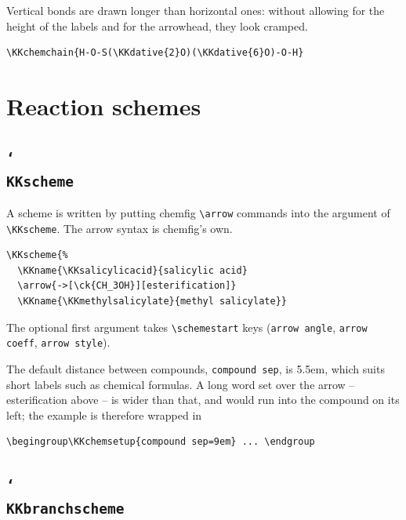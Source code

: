 \documentclass[paper=a4paper,fontsize=10pt]{jlreq}
\begin{document}
Vertical bonds are drawn longer than horizontal ones: without allowing for the
height of the labels and for the arrowhead, they look cramped.

\begin{verbatim}
\KKchemchain{H-O-S(\KKdative{2}O)(\KKdative{6}O)-O-H}
\end{verbatim}

\begin{center}
\KKsulfuricacid\qquad\KKnitricacid\qquad\KKphosphoricacid
\end{center}

\section{Reaction schemes}

\subsection{\texttt{\char`\\KKscheme}}

A scheme is written by putting \textsf{chemfig} \verb|\arrow| commands into the
argument of \verb|\KKscheme|. The arrow syntax is \textsf{chemfig}'s own.

\begin{verbatim}
\KKscheme{%
  \KKname{\KKsalicylicacid}{salicylic acid}
  \arrow{->[\ck{CH_3OH}][esterification]}
  \KKname{\KKmethylsalicylate}{methyl salicylate}}
\end{verbatim}

\begingroup
{}
\endgroup

The optional first argument takes \verb|\schemestart| keys
(\verb|arrow angle|, \verb|arrow coeff|, \verb|arrow style|).

The default distance between compounds, \verb|compound sep|, is 5.5em, which
suits short labels such as chemical formulas. A long word set over the arrow --
\textsf{esterification} above -- is wider than that, and would run into the
compound on its left; the example is therefore wrapped in

\begin{verbatim}
\begingroup\KKchemsetup{compound sep=9em} ... \endgroup
\end{verbatim}

\subsection{\texttt{\char`\\KKbranchscheme}}
\end{document}
